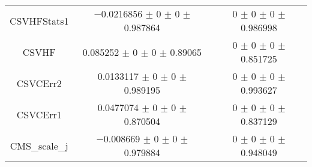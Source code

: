 \begin{table}
\begin{tabular}{ccc}
CSVHFStats1 	& \num{-0.0216856} $\pm$ \num{0} $\pm$ \num{0} $\pm$ \num{0.987864} 	& \num{0} $\pm$ \num{0} $\pm$ \num{0} $\pm$ \num{0.986998}\\
CSVHF 	& \num{0.085252} $\pm$ \num{0} $\pm$ \num{0} $\pm$ \num{0.89065} 	& \num{0} $\pm$ \num{0} $\pm$ \num{0} $\pm$ \num{0.851725}\\
CSVCErr2 	& \num{0.0133117} $\pm$ \num{0} $\pm$ \num{0} $\pm$ \num{0.989195} 	& \num{0} $\pm$ \num{0} $\pm$ \num{0} $\pm$ \num{0.993627}\\
CSVCErr1 	& \num{0.0477074} $\pm$ \num{0} $\pm$ \num{0} $\pm$ \num{0.870504} 	& \num{0} $\pm$ \num{0} $\pm$ \num{0} $\pm$ \num{0.837129}\\
CMS\_scale\_j 	& \num{-0.008669} $\pm$ \num{0} $\pm$ \num{0} $\pm$ \num{0.979884} 	& \num{0} $\pm$ \num{0} $\pm$ \num{0} $\pm$ \num{0.948049}\\
\bottomrule
\end{tabular}
\end{table}
